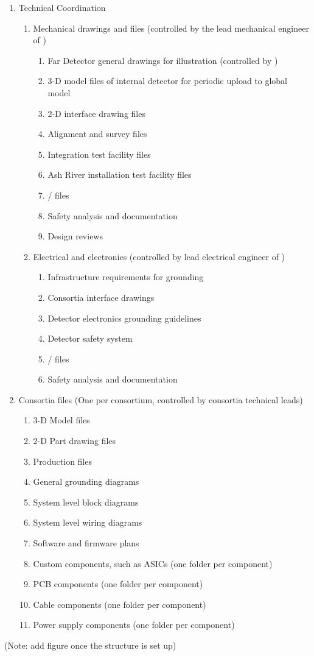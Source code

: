 \begin{enumerate}
 \item Technical Coordination
 \begin{enumerate}
  \item Mechanical drawings and files (controlled by the lead mechanical engineer of )
  \begin{enumerate}
    \item Far Detector general drawings for illustration (controlled by )
    \item 3-D model files of internal detector for periodic upload to global model
    \item 2-D interface drawing files    
    \item Alignment and survey files
    \item Integration test facility files
    \item Ash River installation test facility files
    \item {}/ files
    \item Safety analysis and documentation
    \item Design reviews
  \end{enumerate}
  \item Electrical and electronics (controlled by lead electrical engineer of )
  \begin{enumerate}
    \item Infrastructure requirements for grounding
    \item Consortia interface drawings
    \item Detector electronics grounding guidelines
    \item Detector safety system
    \item {}/ files
    \item Safety analysis and documentation
  \end{enumerate}
 \end{enumerate}
 \item Consortia files (One per consortium, controlled by consortia technical leads)
 \begin{enumerate}
   \item 3-D Model files
   \item 2-D Part drawing files
   \item Production files
   \item General grounding diagrams
   \item System level block diagrams
   \item System level wiring diagrams
   \item Software and firmware plans
   \item Custom components, such as ASICs (one folder per component)
   \item PCB components (one folder per component)
   \item Cable components (one folder per component)
   \item Power supply components (one folder per component)
 \end{enumerate}
\end{enumerate}
(Note: add figure once the  structure is set up)


